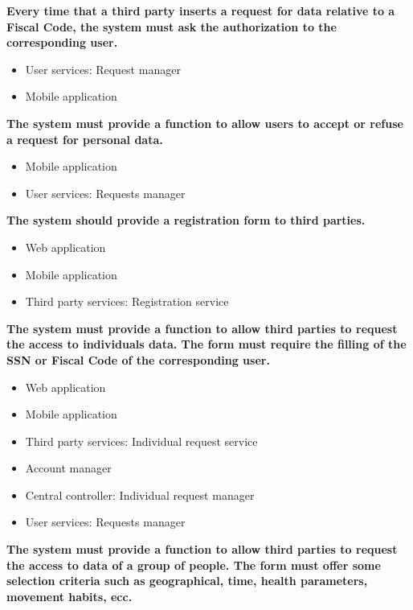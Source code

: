\begin{enumerate} [label={\bf[R\arabic*]}]
\begin{itemize}
        \end{itemize}
    \item \textbf{Every time that a third party inserts a request for data relative to a Fiscal Code, the system must ask the authorization to the corresponding user.}
        \begin{itemize}
            \item User services: Request manager
            \item Mobile application
        \end{itemize}
    \item \textbf{The system must provide a function to allow users to accept or refuse a request for personal data.}
        \begin{itemize}
            \item Mobile application
            \item User services: Requests manager
        \end{itemize}
    \item \textbf{The system should provide a registration form to third parties.}
        \begin{itemize}
            \item Web application
            \item Mobile application
            \item Third party services: Registration service
        \end{itemize}
    \item \textbf{The system must provide a function to allow third parties to request the access to individuals data. The form must require the filling of the SSN or Fiscal Code of the corresponding user.}
        \begin{itemize}
            \item Web application
            \item Mobile application
            \item Third party services: Individual request service
            \item Account manager
            \item Central controller: Individual request manager
            \item User services: Requests manager
        \end{itemize}
    \item \textbf{The system must provide a function to allow third parties to request the access to data of a group of people. The form must offer some selection criteria such as geographical, time, health parameters, movement habits, ecc.}

\end{enumerate}

